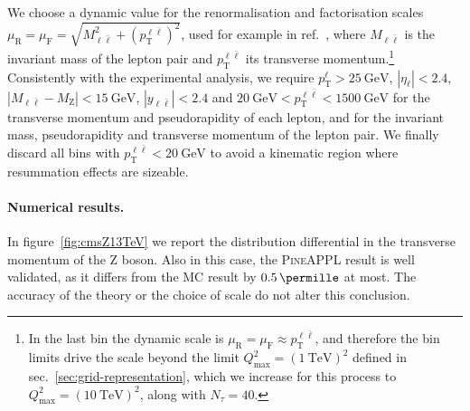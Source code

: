 We choose a dynamic value for the renormalisation and factorisation scales $\mu_\mathrm{R}=\mu_\mathrm{F}=\sqrt{M_{\ell \bar{\ell}}^2 + \left( p_\mathrm{T}^{\ell \bar{\ell}} \right)^2}$, used for example in ref.~\cite{Ridder:2016nkl}, where $M_{\ell \bar{\ell}}$ is the invariant mass of the lepton pair and $p_\mathrm{T}^{\ell \bar{\ell}}$ its transverse momentum.\footnote{In the last bin the dynamic scale is $\mu_\mathrm{R} = \mu_\mathrm{F} \approx p_\mathrm{T}^{\ell \bar{\ell}}$, and therefore the bin limits drive the scale beyond the limit $Q_\text{max}^2 = (\SI{1}{\tera\electronvolt})^2$ defined in sec.~\ref{sec:grid-representation}, which we increase for this process to $Q_\text{max}^2 = (\SI{10}{\tera\electronvolt})^2$, along with $N_\tau = 40$.}
Consistently with the
experimental analysis, we require $p_\mathrm{T}^\ell>\SI{25}{\giga\electronvolt}$,
$|\eta_\ell|<2.4$, $|M_{\ell\bar\ell} - M_\mathrm{Z}| < \SI{15}{\giga\electronvolt}$,
$|y_{\ell\bar\ell}|<2.4$ and $\SI{20}{\giga\electronvolt}<p_\mathrm{T}^{\ell\bar\ell}<\SI{1500}{\giga\electronvolt}$ for the
transverse momentum and pseudorapidity of each lepton, and for the invariant
mass, pseudorapidity and transverse momentum of the lepton pair.
We finally discard all bins with
$p_\mathrm{T}^{\ell \bar{\ell}}<\SI{20}{\giga\electronvolt}$ to avoid a kinematic
region where resummation effects are sizeable.

\paragraph{Numerical results.} In figure~\ref{fig:cmsZ13TeV} we report the
distribution differential in the transverse momentum of the Z
boson. Also in this case, the \textsc{PineAPPL} result is well validated, as it
differs from the MC result by $\SI{0.5}{\permille}$ at most. The accuracy of the
theory or the choice of scale do not alter this conclusion.

